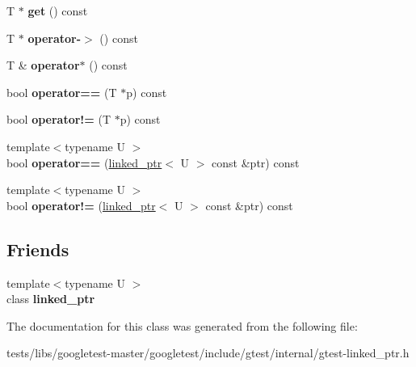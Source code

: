 \begin{DoxyCompactItemize}
T $\ast$ {\bfseries get} () const
\item 
\mbox{\label{classtesting_1_1internal_1_1linked__ptr_a23ff85ac97eed03e945034b65c8eb900}} 
T $\ast$ {\bfseries operator-\/$>$} () const
\item 
\mbox{\label{classtesting_1_1internal_1_1linked__ptr_ac94ad266bf41cbf979a95ca2870908d9}} 
T \& {\bfseries operator$\ast$} () const
\item 
\mbox{\label{classtesting_1_1internal_1_1linked__ptr_ad87ac8ff5543b6fad66e2f3c9844581a}} 
bool {\bfseries operator==} (T $\ast$p) const
\item 
\mbox{\label{classtesting_1_1internal_1_1linked__ptr_a10305395af92bd2fec7bca085cabc99c}} 
bool {\bfseries operator!=} (T $\ast$p) const
\item 
\mbox{\label{classtesting_1_1internal_1_1linked__ptr_a79306e959a4ae7b3a9da641d2ba06ce6}} 
{\footnotesize template$<$typename U $>$ }\\bool {\bfseries operator==} (\hyperlink{classtesting_1_1internal_1_1linked__ptr}{linked\+\_\+ptr}$<$ U $>$ const \&ptr) const
\item 
\mbox{\label{classtesting_1_1internal_1_1linked__ptr_a4801114a83a9e12b08f90e0d28318f26}} 
{\footnotesize template$<$typename U $>$ }\\bool {\bfseries operator!=} (\hyperlink{classtesting_1_1internal_1_1linked__ptr}{linked\+\_\+ptr}$<$ U $>$ const \&ptr) const
\end{DoxyCompactItemize}
\subsection*{Friends}
\begin{DoxyCompactItemize}
\item 
\mbox{\label{classtesting_1_1internal_1_1linked__ptr_a7763f286ca03a7f7363a033d996c8c1c}} 
{\footnotesize template$<$typename U $>$ }\\class {\bfseries linked\+\_\+ptr}
\end{DoxyCompactItemize}


The documentation for this class was generated from the following file\+:\begin{DoxyCompactItemize}
\item 
tests/libs/googletest-\/master/googletest/include/gtest/internal/gtest-\/linked\+\_\+ptr.\+h\end{DoxyCompactItemize}
